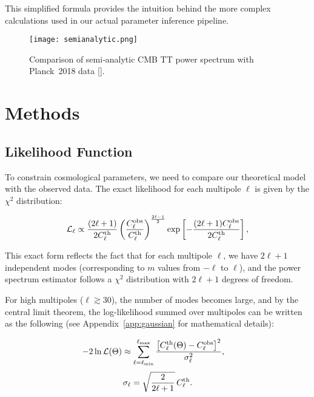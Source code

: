 \documentclass[11pt]{article}
\theoremstyle{definition}
\begin{document}
This simplified formula provides the intuition behind the more complex calculations used in our actual parameter inference pipeline.


\begin{figure}[htbp]
  \centering
  \texttt{[image: semianalytic.png]}
  \caption{Comparison of semi‑analytic CMB TT power spectrum with Planck 2018 data [\cite{planck2018}].}
  \label{fig:cmb-tt-comparison}
\end{figure}

\section{Methods}

\subsection{Likelihood Function}

To constrain cosmological parameters, we need to compare our theoretical model with the observed data. The exact likelihood for each multipole $\ell$ is given by the $\chi^2$ distribution:

\begin{equation}
  \mathcal{L}_\ell \propto \frac{(2\ell+1)}{2C_\ell^{\rm th}} 
  \left(\frac{C_\ell^{\rm obs}}{C_\ell^{\rm th}}\right)^{\frac{2\ell-1}{2}} 
  \exp\left[-\frac{(2\ell+1)C_\ell^{\rm obs}}{2C_\ell^{\rm th}}\right],
\end{equation}

This exact form reflects the fact that for each multipole $\ell$, we have $2\ell+1$ independent modes (corresponding to $m$ values from $-\ell$ to $\ell$), and the power spectrum estimator follows a $\chi^2$ distribution with $2\ell+1$ degrees of freedom. 

For high multipoles ($\ell \gtrsim 30$), the number of modes becomes large, and by the central limit theorem, the log-likelihood summed over multipoles can be written as the following \cite{bond2000} (see Appendix~\ref{app:gaussian} for mathematical details):

\begin{equation}
  -2\ln\mathcal{L}(\Theta)
  \approx \sum_{\ell=\ell_{\min}}^{\ell_{\max}}
    \frac{\bigl[C_\ell^{\rm th}(\Theta)-C_\ell^{\rm obs}\bigr]^2}
         {\sigma_\ell^2},
  \quad
\end{equation}
\begin{equation}
  \sigma_\ell = \sqrt{\frac{2}{2\ell+1}}\,C_\ell^{\rm th}.
\end{equation}
\end{document}
